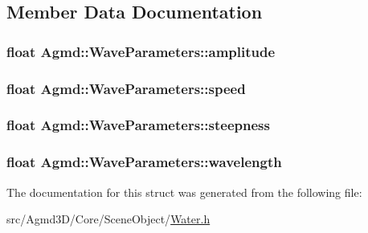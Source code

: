 \subsection{Member Data Documentation}
\hypertarget{struct_agmd_1_1_wave_parameters_aab25ec6659a0ce58f80b0ef29132f17f}{
\subsubsection[{amplitude}]{\setlength{\rightskip}{0pt plus 5cm}float Agmd\+::\+Wave\+Parameters\+::amplitude}}\label{struct_agmd_1_1_wave_parameters_aab25ec6659a0ce58f80b0ef29132f17f}
\hypertarget{struct_agmd_1_1_wave_parameters_aa6c1dae16ce30c1a1d378458a76513ce}{
\subsubsection[{speed}]{\setlength{\rightskip}{0pt plus 5cm}float Agmd\+::\+Wave\+Parameters\+::speed}}\label{struct_agmd_1_1_wave_parameters_aa6c1dae16ce30c1a1d378458a76513ce}
\hypertarget{struct_agmd_1_1_wave_parameters_a16980f83ff8da1a24b02d3bfc4e30122}{
\subsubsection[{steepness}]{\setlength{\rightskip}{0pt plus 5cm}float Agmd\+::\+Wave\+Parameters\+::steepness}}\label{struct_agmd_1_1_wave_parameters_a16980f83ff8da1a24b02d3bfc4e30122}
\hypertarget{struct_agmd_1_1_wave_parameters_a47308e64831fa72e589b7cc0f42459bc}{
\subsubsection[{wavelength}]{\setlength{\rightskip}{0pt plus 5cm}float Agmd\+::\+Wave\+Parameters\+::wavelength}}\label{struct_agmd_1_1_wave_parameters_a47308e64831fa72e589b7cc0f42459bc}


The documentation for this struct was generated from the following file\+:\begin{DoxyCompactItemize}
\item 
src/\+Agmd3\+D/\+Core/\+Scene\+Object/\hyperlink{_water_8h}{Water.\+h}\end{DoxyCompactItemize}
